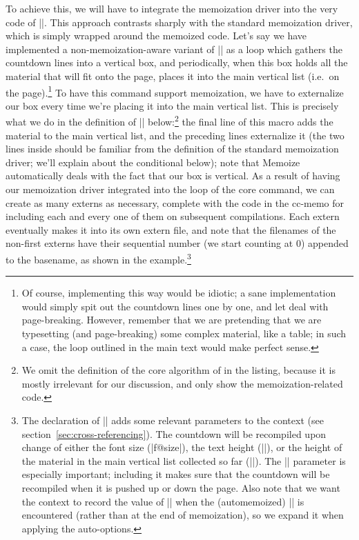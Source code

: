 \documentclass[a4paper,11pt]{article}
\begin{document}
To achieve this, we will have to integrate the memoization driver into the very
code of |\countdown|.  This approach contrasts sharply with the standard
memoization driver, which is simply wrapped around the memoized code.  Let's
say we have implemented a non-memoization-aware variant of |\countdown| as a
loop which gathers the countdown lines into a vertical box, and periodically,
when this box holds all the material that will fit onto the page, places it
into the main vertical list (i.e.\ on the page).\footnote{Of course,
  implementing  this way would be idiotic; a sane implementation
  would simply spit out the countdown lines one by one, and let 
  deal with page-breaking.  However, remember that we are pretending that we
  are typesetting (and page-breaking) some complex material, like a table; in
  such a case, the loop outlined in the main text would make perfect sense.}
To have this command support memoization, we have to externalize our box every
time we're placing it into the main vertical list.  This is precisely what we
do in the definition of |\countdowntypeset| below:\footnote{We omit the
  definition of the core algorithm of  in the listing, because it
  is mostly irrelevant for our discussion, and only show the
  memoization-related code.} the final line of this macro adds the material to
the main vertical list, and the preceding lines externalize it (the two lines
inside  should be familiar from the definition of the
standard memoization driver; we'll explain about the conditional below); note
that Memoize automatically deals with the fact that our box is vertical.  As a
result of having our memoization driver integrated into the loop of the core
command, we can create as many externs as necessary, complete with the code in
the cc-memo for including each and every one of them on subsequent
compilations.  Each extern eventually makes it into its own extern file, and
note that the filenames of the non-first externs have their sequential number
(we start counting at $0$) appended to the basename, as shown in the
example.\cprotect\footnote{The  declaration of |\countdown| adds
  some relevant parameters to the context (see
  section~\ref{sec:cross-referencing}).  The countdown will be recompiled upon
  change of either the font size (|f@size|), the text height (|\textheight|),
  or the height of the material in the main vertical list collected so far
  (|\pagetotal|).  The |\pagetotal| parameter is especially important;
  including it makes sure that the countdown will be recompiled when it is
  pushed up or down the page.  Also note that we want the context to record the
  value of |\pagetotal| when the (automemoized) |\countdown| is encountered
  (rather than at the end of memoization), so we expand it when applying the
  auto-options.}
\end{document}
